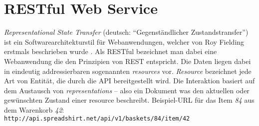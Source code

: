 \section{RESTful Web Service}

\emph{Representational State Transfer} (deutsch: \enquote{Gegenständlicher Zustandstransfer}) ist ein Softwarearchitekturstil für Webanwendungen, welcher von Roy Fielding erstmals beschrieben wurde \cite{fieldingDissertation}. Als \gls{RESTful} bezeichnet man dabei eine Webanwendung die den Prinzipien von \gls{REST} entspricht. 
Die Daten liegen dabei in eindeutig addressierbaren sogenannten \emph{resources} vor. 
\emph{Resource} bezeichnet jede Art von Entität, die durch die API bereitgestellt wird.
Die Interaktion basiert auf dem Austausch von \emph{representations} -- also ein Dokument was den aktuellen oder gewünschten Zustand einer resource beschreibt.
Beispiel-URL für das Item \emph{84} aus dem Warenkorb \emph{42}:\\
\texttt{http://api.spreadshirt.net/api/v1/baskets/84/item/42}